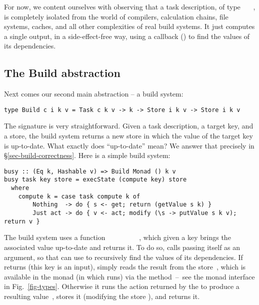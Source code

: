 For now, we content ourselves with observing that a task description,
of type ~~~, is completely isolated from the world of
compilers, calculation chains, file systems, caches, and all other
complexities of real build systems.  It just computes a single output, in
a side-effect-free way, using a callback () to find the values
of its dependencies.

\subsection{The Build abstraction}\label{sec-general-build}

Next comes our second main abstraction -- a build system:
\vspace{1mm}
\begin{verbatim}
type Build c i k v = Task c k v -> k -> Store i k v -> Store i k v
\end{verbatim}
\vspace{1mm}
The signature is very straightforward.  Given a task description, a target key,
and a store, the build system returns a new store in which the value of the
target key is up-to-date. What exactly does ``up-to-date'' mean?  We answer
that precisely in \S\ref{sec-build-correctness}. Here is a simple build system:

\vspace{1mm}
\begin{verbatim}
busy :: (Eq k, Hashable v) => Build Monad () k v
busy task key store = execState (compute key) store
  where
    compute k = case task compute k of
        Nothing  -> do { s <- get; return (getValue s k) }
        Just act -> do { v <- act; modify (\s -> putValue s k v); return v }
\end{verbatim}
\vspace{1mm}

\noindent
The  build system uses a function
~\hs{::}~~\hs{->}~~~~~~,
which given a key brings the associated value up-to-date and returns it. To do
so,  calls  passing itself as an argument, so that 
can use  to recursively find the values of its dependencies. If
 returns  (this key is an input),  simply reads
the result from the store~, which is available in the  monad (in
which  runs) via the  method~--~see the  monad
interface in Fig.~\ref{fig-types}. Otherwise it runs the action 
returned by the  to produce a resulting value~, stores it
(modifying the store ), and returns it.

